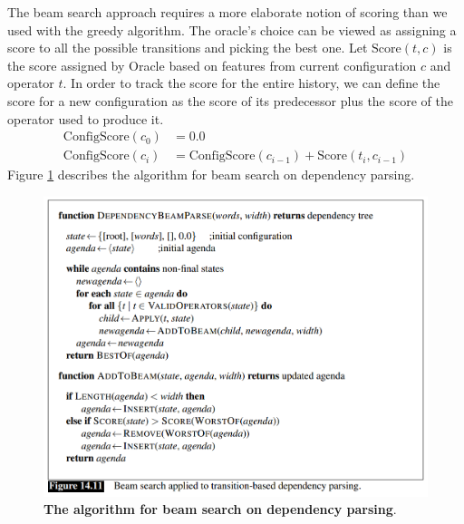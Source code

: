 \documentclass[11pt]{article}
\begin{document}
\begin{itemize}
The beam search approach requires a more elaborate notion of scoring than we used with the greedy algorithm. The oracle's choice can be viewed as assigning a score to all the
possible transitions and picking the best one. Let $\text{Score}(t,c)$ is the score assigned by Oracle based on features from current configuration $c$ and operator $t$. In order to track the score for the entire history, we can define the score for a new configuration as the score of its predecessor plus the score of the operator used to produce it.
\begin{align*}
\text{ConfigScore}(c_0) &= 0.0\\
\text{ConfigScore}(c_i) &= \text{ConfigScore}(c_{i-1})+ \text{Score}(t_i, c_{i-1})
\end{align*} Figure \ref{fig: beam_search_dep_parse} describes the algorithm for beam search on dependency parsing.
\end{itemize}

\begin{figure}
\begin{minipage}[t]{1\linewidth}
  \centering
  \centerline{\includegraphics[scale = 0.4]{beam_search_dep_parse.png}}
\end{minipage}
\caption{\footnotesize{\textbf{The algorithm for beam search on dependency parsing}.}}
\label{fig: beam_search_dep_parse}
\end{figure}
\end{document}
